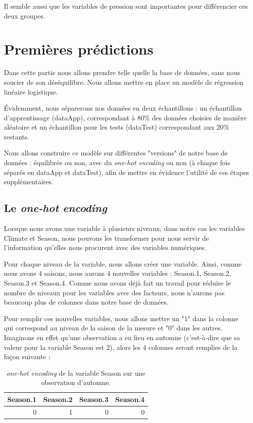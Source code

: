 \documentclass{article}
\begin{document}
Il semble aussi que les variables de pression sont importantes pour différencier ces deux groupes. 

\section{Premières prédictions}

Dans cette partie nous allons prendre telle quelle la base de données, sans nous soucier de son déséquilibre. Nous allons mettre en place un modèle de régression linéaire logistique.

Évidemment, nous séparerons nos données en deux échantillons : un échantillon d'apprentissage (dataApp), correspondant à 80\% des données choisies de manière aléatoire et un échantillon pour les tests (dataTest) correspondant aux 20\% restants.

Nous allons construire ce modèle sur différentes "versions" de notre base de données : équilibrée ou non, avec du \emph{one-hot encoding} ou non (à chaque fois séparés en dataApp et dataTest), afin de mettre en évidence l'utilité de ces étapes supplémentaires.

\subsection{Le \emph{one-hot encoding}}

Lorsque nous avons une variable à plusieurs niveaux, dans notre cas les variables Climate et Season, nous pouvons les transformer pour nous servir de l'information qu'elles nous procurent avec des variables numériques. 

Pour chaque niveau de la variable, nous allons créer une variable. Ainsi, comme nous avons 4 saisons, nous aurons 4 nouvelles variables : Season.1, Season.2, Season.3 et Season.4. Comme nous avons déjà fait un travail pour réduire le nombre de niveaux pour les variables avec des facteurs, nous n'aurons pas beaucoup plus de colonnes dans notre base de données. 

Pour remplir ces nouvelles variables, nous allons mettre un "1" dans la colonne qui correspond au niveau de la saison de la mesure et "0" dans les autres. Imaginons en effet qu'une observation a eu lieu en automne (c'est-à-dire que sa valeur pour la variable Season est 2), alors les 4 colonnes seront remplies de la façon suivante : 

\begin{table}[H]
    \centering
    \begin{tabular}{|rrrr|}
        \hline
        Season.1 & Season.2 & Season.3 & Season.4 \\
        \hline 
        0 & 1 & 0 & 0 \\
        \hline
    \end{tabular}
    \caption{\emph{one-hot encoding} de la variable Season sur une observation d'automne.}
\end{table}
\end{document}
